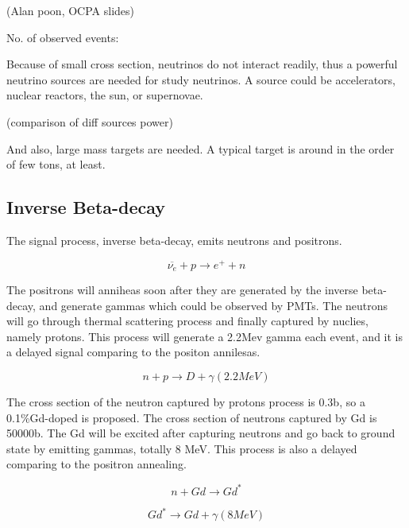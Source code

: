 (Alan poon, OCPA slides)

No. of observed events:

Because of small cross section, neutrinos do not interact readily, thus
a powerful neutrino sources are needed for study neutrinos. A source could be
accelerators, nuclear reactors, the sun, or supernovae.

(comparison of diff sources power)

And also, large mass targets are needed. A typical target is around in the order
of few tons, at least.





\subsection{Inverse Beta-decay}


The signal process, inverse beta-decay, emits neutrons and positrons.


\begin{equation}
\overline{\nu_e} + p \rightarrow e^+ + n
\label{InverseBetaDecay}
\end{equation}


The positrons will anniheas soon after they are generated by the inverse beta-decay,
and generate gammas which could be observed by PMTs. The neutrons will go through
thermal scattering process and finally captured by nuclies, namely protons. This
process will generate a 2.2Mev gamma each event, and it is a delayed signal comparing
to the positon annilesas.


\begin{equation}
n + p \rightarrow D + \gamma (2.2 MeV)
\label{NeutronPCapture}
\end{equation}


The cross section of the neutron captured by protons process is 0.3b, so a 0.1\%Gd-doped
is proposed. The cross section of neutrons captured by Gd is 50000b. The Gd will be excited
after capturing neutrons and go back to ground state by emitting gammas, totally 8 MeV. This
process is also a delayed comparing to the positron annealing.


\begin{equation}
n + Gd \rightarrow Gd^*
\label{NeutronGdCapture}
\end{equation}


\begin{equation}
Gd^* \rightarrow Gd + \gamma (8 MeV)
\label{GdStarToGd}
\end{equation}


